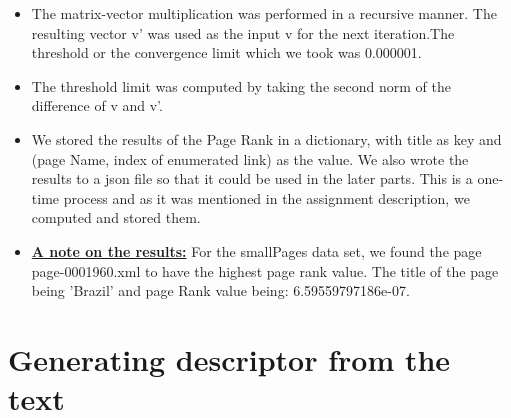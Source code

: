 \documentclass[11pt]{article}
\begin{document}
\begin{itemize}
\item The matrix-vector multiplication was performed in a recursive manner. The resulting vector v' was used as the input v for the next iteration.The threshold or the convergence limit which we took was 0.000001.

\item The threshold limit was computed by taking the second norm of the difference of v and v'.

\item We stored the results of the Page Rank in a dictionary, with title as key and (page Name, index of enumerated link) as the value. We also wrote the results to a json file so that it could be used in the later parts. This is a one-time process and as it was mentioned in the assignment description, we computed and stored them.

\item \textbf{\underline{A note on the results:}} For the smallPages data set, we found the page page-0001960.xml to have the highest page rank value. The title of the page being 'Brazil' and page Rank value being:  6.59559797186e-07.

\end{itemize}

\section{Generating descriptor from the text}
\end{document}
